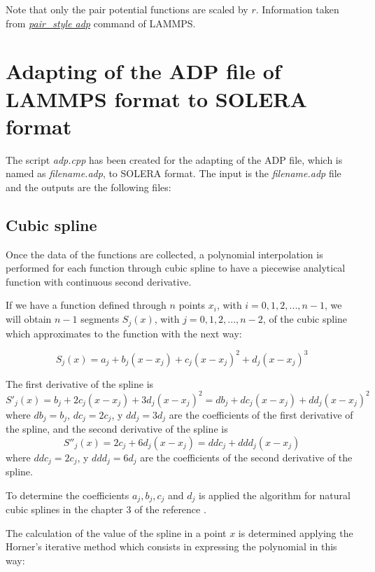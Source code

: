 \documentclass{article}
\begin{document}
Note that only the pair potential functions are scaled by $r$. Information taken from \href{https://docs.lammps.org/pair_adp.html}{\textit{pair\_style adp}} command of LAMMPS.


\section{Adapting of the ADP file of LAMMPS format to SOLERA format}
The script \textit{adp.cpp} has been created for the adapting of the ADP file, which is named as \textit{filename.adp}, to SOLERA format. The input is the \textit{filename.adp} file and the outputs are the following files:

\subsection{Cubic spline}
Once the data of the functions are collected, a polynomial interpolation is performed for each function through cubic spline to have a piecewise analytical function with continuous second derivative.

If we have a function defined through $n$ points $x_i$, with $i=0,1,2,...,n-1$, we will obtain $n-1$ segments $S_j(x)$, with $j=0,1,2,...,n-2$, of the cubic spline which approximates to the function with the next way:

\begin{equation}
	S_j(x)=a_j+b_j(x-x_j)+c_j(x-x_j)^2+d_j(x-x_j)^3
\end{equation}

The first derivative of the spline is
\begin{equation}
	S'_j(x)=b_j+2c_j(x-x_j)+3d_j(x-x_j)^2=db_j+dc_j(x-x_j)+dd_j(x-x_j)^2
\end{equation}
where $db_j=b_j$, $dc_j=2c_j$, y $dd_j=3d_j$ are the coefficients of the first derivative of the spline, and the second derivative of the spline is
\begin{equation}
	S''_j(x)=2c_j+6d_j(x-x_j)=ddc_j+ddd_j(x-x_j)
\end{equation}
where $ddc_j=2c_j$, y $ddd_j=6d_j$ are the coefficients of the second derivative of the spline.

To determine the coefficients $a_j,b_j,c_j$ and $d_j$ is applied the algorithm for natural cubic splines in the chapter 3 of the reference \cite{BurFai11}. 

The calculation of the value of the spline in a point $x$ is determined applying the Horner's iterative method which consists in expressing the polynomial in this way:
\end{document}

